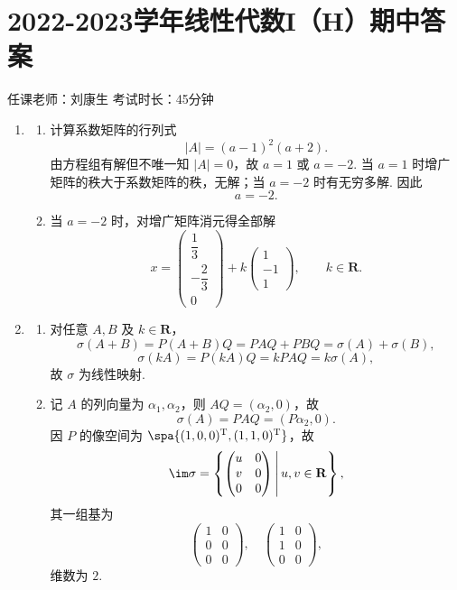 \section{2022-2023学年线性代数I（H）期中答案}

\begin{center}
    任课老师：刘康生\hspace{4em} 考试时长：45分钟
\end{center}
\begin{enumerate}
    \item
    \begin{enumerate}
        \item 计算系数矩阵的行列式
        \[
            |A|=(a-1)^2(a+2).
        \]
        由方程组有解但不唯一知 $|A|=0$，故 $a=1$ 或 $a=-2$. 当 $a=1$ 时增广矩阵的秩大于系数矩阵的秩，无解；当 $a=-2$ 时有无穷多解. 因此
        \[
            a=-2.
        \]

        \item 当 $a=-2$ 时，对增广矩阵消元得全部解
        \[
            x=\begin{pmatrix}\dfrac13\\[4pt]-\dfrac23\\[4pt]0\end{pmatrix}
            +k\begin{pmatrix}1\\-1\\1\end{pmatrix},\qquad k\in\mathbf{R}.
        \]
    \end{enumerate}

    \item
    \begin{enumerate}
        \item 对任意 $A,B$ 及 $k\in\mathbf{R}$，
        \[
            \sigma(A+B)=P(A+B)Q=PAQ+PBQ=\sigma(A)+\sigma(B),
        \]
        \[
            \sigma(kA)=P(kA)Q=kPAQ=k\sigma(A),
        \]
        故 $\sigma$ 为线性映射.

        \item 记 $A$ 的列向量为 $\alpha_1,\alpha_2$，则 $AQ=(\alpha_2,0)$，故
        \[
            \sigma(A)=PAQ=(P\alpha_2,0).
        \]
        因 $P$ 的像空间为 $\spa\{(1,0,0)^\mathrm{T},(1,1,0)^\mathrm{T}\}$，故
        \[
            \im\sigma
            =\left\{\begin{pmatrix}u&0\\v&0\\0&0\end{pmatrix}\,\middle|\,u,v\in\mathbf{R}\right\},
        \]
        其一组基为
        \[
            \begin{pmatrix}1&0\\0&0\\0&0\end{pmatrix},\quad
            \begin{pmatrix}1&0\\1&0\\0&0\end{pmatrix},
        \]
        维数为 $2$.


\end{enumerate}
\end{enumerate}
